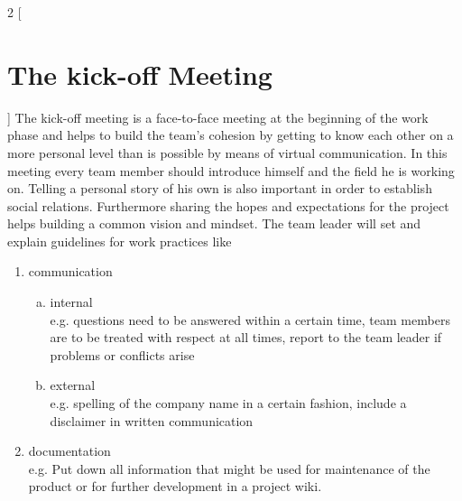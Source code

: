 \begin{multicols}{2}
[\section{The kick-off Meeting}]
The kick-off meeting is a face-to-face meeting at the beginning of the work phase and helps to build the team’s cohesion by getting to know each other on a more personal level than is possible by means of virtual communication.
In this meeting every team member should introduce himself and the field he is working on. Telling a personal story of his own is also important in order to establish social relations. Furthermore sharing the hopes and expectations for the project helps building a common vision and mindset.
The team leader will set and explain guidelines for work practices like
  \begin{enumerate}[1.]
	\item communication
		\begin{enumerate}[a)]
		  	\item internal\\
				e.g. questions need to be answered within a certain time, team members are to be treated with respect at all times, report to the team leader if problems or conflicts arise
			\item external\\
				e.g. spelling of the company name in a certain fashion, include a disclaimer in written communication
		\end{enumerate}
	\item documentation\\
e.g. Put down all information that might be used for maintenance of the product or for further development in a project wiki.
  \end{enumerate}
\end{multicols}